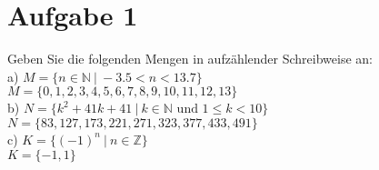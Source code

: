 \section*{Aufgabe 1}

Geben Sie die folgenden Mengen in aufzählender Schreibweise an:\\

a) $M = \{n \in \mathbb{N} \ | \ -3.5 < n < 13.7\}$\\

$M = \{0, 1, 2, 3, 4, 5, 6, 7, 8, 9, 10, 11, 12, 13\}$\\

b) $N = \{k^2 + 41k + 41 \ | \ k \in \mathbb{N} \text{ und } 1 \leq k < 10\}$\\

$N = \{83, 127, 173, 221, 271, 323, 377, 433, 491\}$\\

c) $K = \{(-1)^n \ | \ n \in \mathbb{Z}\}$\\

$K = \{-1, 1\}$\\

